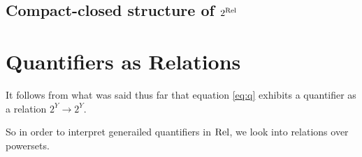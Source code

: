 \subsection{Compact-closed structure of $\wp\Rel$}




\section{Quantifiers as Relations}
\renewcommand{\wp}[1]{2^{#1}} It follows from what was said thus far
that equation \eqref{eq:q} exhibits a quantifier as a relation $\wp{Y}
\to \wp{Y}$.


So in order to interpret generailed quantifiers in $\mathrm{Rel}$, we look
into relations over powersets. 





